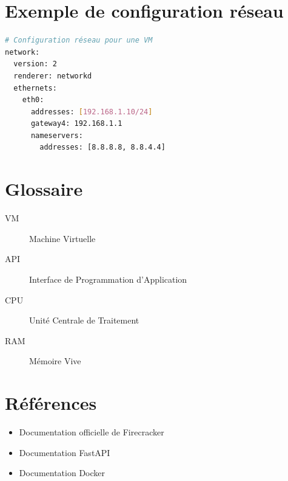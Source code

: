 \documentclass[12pt,a4paper]{report}
\begin{document}
\section{Exemple de configuration réseau}
\begin{lstlisting}[language=bash]
# Configuration réseau pour une VM
network:
  version: 2
  renderer: networkd
  ethernets:
    eth0:
      addresses: [192.168.1.10/24]
      gateway4: 192.168.1.1
      nameservers:
        addresses: [8.8.8.8, 8.8.4.4]
\end{lstlisting}
\section{Glossaire}
\begin{description}
    \item[VM] Machine Virtuelle
    \item[API] Interface de Programmation d'Application
    \item[CPU] Unité Centrale de Traitement
    \item[RAM] Mémoire Vive
\end{description}

\section{Références}
\begin{itemize}
    \item Documentation officielle de Firecracker
    \item Documentation FastAPI
    \item Documentation Docker
\end{itemize}
\end{document}
